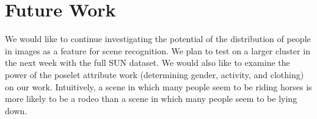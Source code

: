 \documentclass[11pt]{article}
\begin{document}
\section{Future Work}
We would like to continue investigating the potential of the distribution of people in images as a feature for scene recognition.  We plan to test on a larger cluster in the next week with the full SUN dataset.  We would also like to examine the power of the poselet attribute work (determining gender, activity, and clothing) on our work.  Intuitively, a scene in which many people seem to be riding horses is more likely to be a rodeo than a scene in which many people seem to be lying down.



\end{document}
